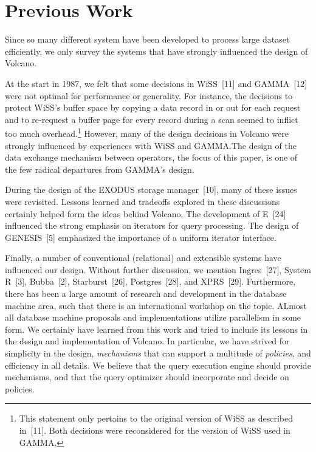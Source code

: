 \documentclass[a4paper,11pt,notitlepage,twoside,openright]{article}
\begin{document}
\section{Previous Work}

Since so many different system have been developed
to process large dataset efficiently, we only survey the systems
that have strongly influenced the design of Volcano.

At the start in 1987, we felt that some decisions in
WiSS~{[11]} and GAMMA~{[12]} were not optimal for performance
or generality. For instance, the decisions to protect
WiSS's buffer space by copying a data record in or out for
each request and to re-request a buffer page for every
record during a scan seemed to inflict too much overhead.\footnote{
  This statement only pertains to the original version of
  WiSS as described in~{[11]}. Both decisions were reconsidered for
  the version of WiSS used in GAMMA.
}
However, many of the design decisions in Volcano were
strongly influenced by experiences with WiSS and
GAMMA.The design of the data exchange mechanism
between operators, the focus of this paper, is one of the
few radical departures from GAMMA's design.

During the design of the EXODUS storage manager~{[10]},
many of these issues were revisited. Lessons learned
and tradeoffs explored in these discussions certainly helped
form the ideas behind Volcano. The development of E~{[24]}
influenced the strong emphasis on iterators for query processing.
The design of GENESIS~{[5]} emphasized the
importance of a uniform iterator interface.

Finally, a number of conventional (relational) and
extensible systems have influenced our design. Without
further discussion, we mention Ingres~{[27]}, System R~{[3]},
Bubba~{[2]}, Starburst~{[26]}, Postgres~{[28]}, and XPRS~{[29]}.
Furthermore, there has been a large amount of research and
development in the database machine area, such that there
is an international workshop on the topic. ALmost all database
machine proposals and implementations utilize parallelism
in some form. We certainly have learned from this
work and tried to include its lessons in the design and
implementation of Volcano. In particular, we have strived
for simplicity in the design, \emph{mechanisms} that can support a
multitude of \emph{policies}, and efficiency in all details. We
believe that the query execution engine should provide
mechanisms, and that the query optimizer should incorporate
and decide on policies.
\end{document}
